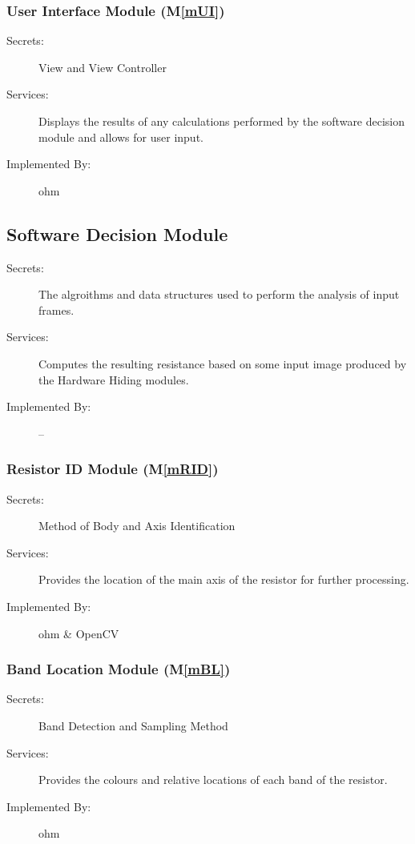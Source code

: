 \documentclass[12pt, titlepage]{article}
\newcommand{\mref}[1]{M\ref{#1}}
\begin{document}
\subsubsection{User Interface Module (\mref{mUI})}

\begin{description}
\item[Secrets:] View and View Controller
\item[Services:] Displays the results of any calculations performed by the software decision module and allows for user input.
\item[Implemented By:] ohm
\end{description}

\subsection{Software Decision Module}

\begin{description}
\item[Secrets:] The algroithms and data structures used to perform the analysis of input frames.
\item[Services:] Computes the resulting resistance based on some input image produced by the Hardware Hiding modules.
\item[Implemented By:] --
\end{description}

\subsubsection{Resistor ID Module (\mref{mRID})}

\begin{description}
\item[Secrets:] Method of Body and Axis Identification
\item[Services:] Provides the location of the main axis of the resistor for further processing.
\item[Implemented By:] ohm \& OpenCV
\end{description}

\subsubsection{Band Location Module (\mref{mBL})}

\begin{description}
\item[Secrets:] Band Detection and Sampling Method
\item[Services:] Provides the colours and relative locations of each band of the resistor.
\item[Implemented By:] ohm
\end{description}
\end{document}
